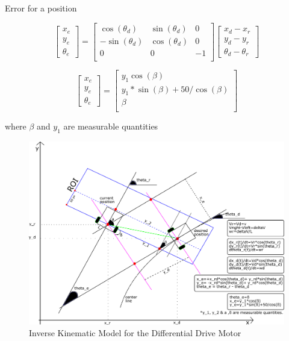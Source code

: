 \documentclass[a4paper,12pt]{article}
\begin{document}
\begin{appendices}
	Error for a position


$$ 
	\begin{bmatrix} {x_e} \\ {y_e} \\ {\theta_e}  \end{bmatrix}
 	=
  	\begin{bmatrix}
   	\cos (\theta_d) & \sin (\theta_d) & 0\\
   	-\sin (\theta_d) & \cos (\theta_d) & 0\\
    0 & 0 &  -1 \\
   	\end{bmatrix}
	\begin{bmatrix} x_d-x_r \\ y_d-y_r \\ \theta_d-\theta_r \end{bmatrix}
$$


$$ 
	\begin{bmatrix} {x_e} \\ {y_e} \\ {\theta_e}  \end{bmatrix}
 	=
  	\begin{bmatrix}
   	y_1 \cos (\beta)\\
   	y_1*\sin (\beta) + 50/\cos (\beta)\\
    \beta \\
   	\end{bmatrix}
$$

where $\beta$ and $y_1$ are measurable quantities

\begin{figure}[H]
	\center
	\setlength{\unitlength}{\textwidth} 
	\includegraphics[width=1.0\unitlength]{state_3}
	\caption{\label{fig:stateFB} Inverse Kinematic Model for the Differential Drive Motor}
\end{figure}


\end{appendices}
		
\end{document}
